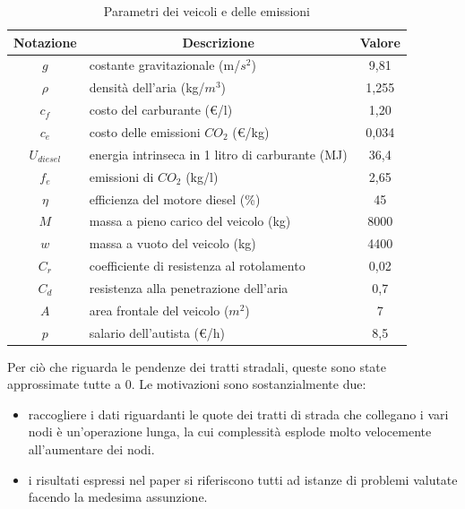 		\begin{table}[]
			\centering
			\begin{tabular}{@{}clc@{}}
					\toprule
					Notazione    & \multicolumn{1}{c}{Descrizione}                  & Valore \\ \midrule
					$g$          & costante gravitazionale (m/$s^2$)                & 9,81   \\
					$\rho$       & densità dell'aria (kg/$m^3$)                     & 1,255  \\
					$c_f$        & costo del carburante (€/l)                       & 1,20   \\
					$c_e$        & costo delle emissioni $CO_2$ (€/kg)              & 0,034  \\
					$U_{diesel}$ & energia intrinseca in 1 litro di carburante (MJ) & 36,4   \\
					$f_e$        & emissioni di $CO_2$ (kg/l)                       & 2,65   \\
					$\eta$       & efficienza del motore diesel (\%)                & 45     \\
					$M$          & massa a pieno carico del veicolo (kg)            & 8000   \\
					$w$          & massa a vuoto del veicolo (kg)                   & 4400   \\
					$C_r$        & coefficiente di resistenza al rotolamento        & 0,02   \\
					$C_d$        & resistenza alla penetrazione dell'aria           & 0,7    \\
					$A$          & area frontale del veicolo ($m^2$)                & 7      \\
					$p$          & salario dell'autista (€/h)                       & 8,5    \\ \bottomrule
			\end{tabular}
			\caption{Parametri dei veicoli e delle emissioni}
			\label{table:parametri statici}
		\end{table}

		Per ciò che riguarda le pendenze dei tratti stradali, queste sono state approssimate tutte a 0.
		Le motivazioni sono sostanzialmente due:

		\begin{itemize}
			\item raccogliere i dati riguardanti le quote dei tratti di strada che collegano i vari nodi è un’operazione lunga, la cui complessità esplode molto velocemente all’aumentare dei nodi.
			\item i risultati espressi nel paper \cite{Laporte11} si riferiscono tutti ad istanze di problemi valutate facendo la medesima assunzione.
		\end{itemize}


